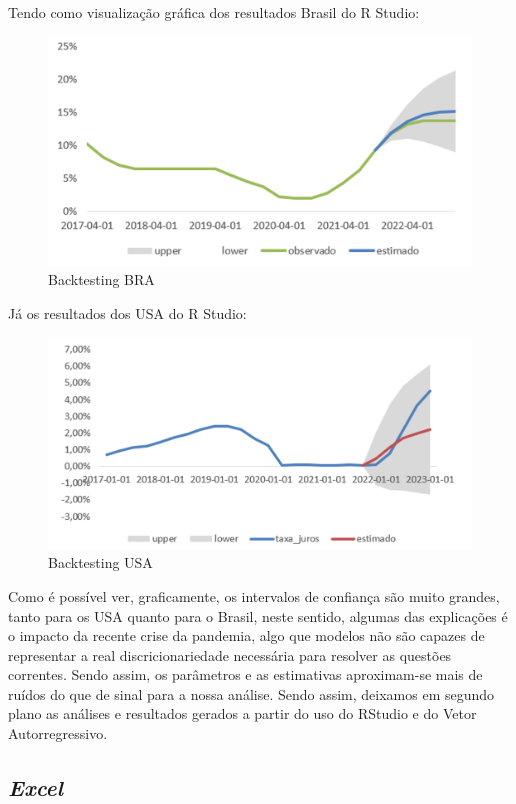 Tendo como visualiza\c{c}\~{a}o gr\'{a}fica dos resultados Brasil do R Studio:

\begin{figure}
    \centering
    \caption{Backtesting BRA}
    \includegraphics[width = 0.75\linewidth]{relatorios/macro/imagens/grafico2}
\end{figure}


J\'{a} os resultados dos USA do R Studio:


\begin{figure}
    \centering
    \caption{Backtesting USA}
    \includegraphics[width = 0.75\linewidth]{relatorios/macro/imagens/grafico3}
\end{figure}


 Como \'{e} poss\'{i}vel ver, graficamente, os intervalos de confian\c{c}a s\~{a}o muito grandes, tanto para os USA quanto para o Brasil, neste sentido, algumas das explica\c{c}\~{o}es \'{e} o impacto da recente crise da pandemia, algo que modelos n\~{a}o s\~{a}o capazes de representar a real discricionariedade necess\'{a}ria para resolver as quest\~{o}es correntes. Sendo assim, os par\^{a}metros e as estimativas aproximam-se mais de ru\'{i}dos do que de sinal para a nossa an\'{a}lise. Sendo assim, deixamos em segundo plano as an\'{a}lises e resultados gerados a partir do uso do RStudio e do Vetor Autorregressivo. \textbf{}

\subsection*{\textit{Excel}}


